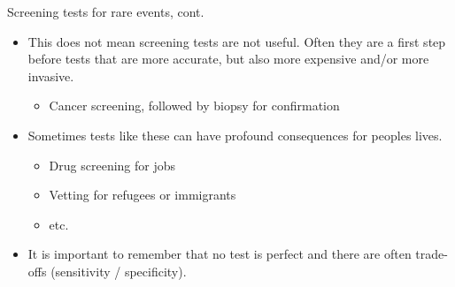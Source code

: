 \documentclass[xcolor=table]{beamer}
\begin{document}
\begin{frame}{Screening tests for rare events, cont.}
\begin{block}{}
\begin{itemize}
\item This does not mean screening tests are not useful. Often they are a first step before tests that are more accurate, but also more expensive and/or more invasive.
\begin{itemize}
\item Cancer screening, followed by biopsy for confirmation
\end{itemize}

\pause
\item Sometimes tests like these can have profound consequences for peoples lives.
\begin{itemize}
\item Drug screening for jobs
\item Vetting for refugees or immigrants 
\item etc.
\end{itemize}

\pause
\item It is important to remember that no test is perfect and there are often trade-offs (sensitivity / specificity).
\end{itemize}
\end{block}
\end{frame}
\end{document}
